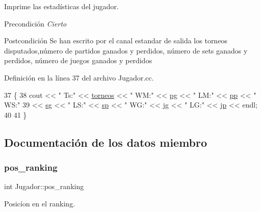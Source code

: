 Imprime las estadísticas del jugador. 

\begin{DoxyPrecond}{Precondición}
{\itshape Cierto} 
\end{DoxyPrecond}
\begin{DoxyPostcond}{Postcondición}
Se han escrito por el canal estandar de salida los torneos disputados,número de partidos ganados y perdidos, número de sets ganados y perdidos, número de juegos ganados y perdidos 
\end{DoxyPostcond}


Definición en la línea 37 del archivo Jugador.\+cc.


\begin{DoxyCode}
37                                   \{
38     cout << \textcolor{stringliteral}{" Ts:"} << \hyperlink{class_jugador_a2c4256c69ddf76e1c4f1e48f56ed305c}{torneos} << \textcolor{stringliteral}{" WM:"} << \hyperlink{class_jugador_ab254a72417747985ffaf53b0508e5e31}{pg} << \textcolor{stringliteral}{" LM:"} << \hyperlink{class_jugador_a90af14828909d3c5cd3fb4a285e96daf}{pp} << \textcolor{stringliteral}{" WS:"} 
39          << \hyperlink{class_jugador_a678970fa93782e3e68f939c37fff5030}{sg} << \textcolor{stringliteral}{" LS:"} << \hyperlink{class_jugador_a5bed10a21acb0c437828df282050b2ab}{sp} << \textcolor{stringliteral}{" WG:"} << \hyperlink{class_jugador_a53ac73c3dc720ca6e66406b309077472}{jg} << \textcolor{stringliteral}{" LG:"} << \hyperlink{class_jugador_a306eb04292a1aa300a39c2464c1368fd}{jp} << endl;
40 
41 \}
\end{DoxyCode}


\subsection{Documentación de los datos miembro}
\mbox{\label{class_jugador_a200ee7c036d98654af6fab08b8b909e9}} 
\subsubsection{\texorpdfstring{pos\+\_\+ranking}{pos\_ranking}}
{\footnotesize\ttfamily int Jugador\+::pos\+\_\+ranking\hspace{0.3cm}{\ttfamily [private]}}



Posicíon en el ranking. 



